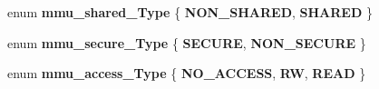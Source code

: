 \begin{DoxyCompactItemize}
\item 
enum {\bfseries mmu\+\_\+shared\+\_\+\+Type} \{ {\bfseries N\+O\+N\+\_\+\+S\+H\+A\+R\+ED}, 
{\bfseries S\+H\+A\+R\+ED}
 \}\hypertarget{group___m_m_u___functions_gab884a11fa8d094573ab77fb1c0f8d8a7}{}\label{group___m_m_u___functions_gab884a11fa8d094573ab77fb1c0f8d8a7}

\item 
enum {\bfseries mmu\+\_\+secure\+\_\+\+Type} \{ {\bfseries S\+E\+C\+U\+RE}, 
{\bfseries N\+O\+N\+\_\+\+S\+E\+C\+U\+RE}
 \}\hypertarget{group___m_m_u___functions_gac3d277641df9fb3bb3b555e2e79dd639}{}\label{group___m_m_u___functions_gac3d277641df9fb3bb3b555e2e79dd639}

\item 
enum {\bfseries mmu\+\_\+access\+\_\+\+Type} \{ {\bfseries N\+O\+\_\+\+A\+C\+C\+E\+SS}, 
{\bfseries RW}, 
{\bfseries R\+E\+AD}
 \}\hypertarget{group___m_m_u___functions_ga2ee598252f996e4f96640b096291d280}{}\label{group___m_m_u___functions_ga2ee598252f996e4f96640b096291d280}

\end{DoxyCompactItemize}
